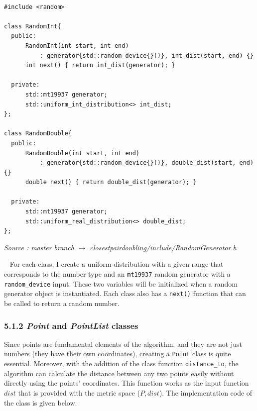 \documentclass[12pt,english,]{article}
\newcommand{\code}[1]{\colorbox{lbcolor}{\texttt{#1}}}
\begin{document}
~

\begin{lstlisting}
#include <random>

class RandomInt{
  public:
      RandomInt(int start, int end) 
          : generator{std::random_device{}()}, int_dist(start, end) {}
      int next() { return int_dist(generator); } 

  private:
      std::mt19937 generator;
      std::uniform_int_distribution<> int_dist;
};

class RandomDouble{
  public:
      RandomDouble(int start, int end) 
          : generator{std::random_device{}()}, double_dist(start, end) {}
      double next() { return double_dist(generator); } 

  private:
      std::mt19937 generator;
      std::uniform_real_distribution<> double_dist;
};
\end{lstlisting}
\vspace{-2truemm}
\begin{minipage}{1\textwidth}
  \begin{flushright}
  {\footnotesize \emph{Source \footnotemark: master branch $\rightarrow$ closestpairdoubling/include/RandomGenerator.h }\par}
  \end{flushright}
\end{minipage}
\vspace{0.5truemm}

~ For each class, I create a uniform distribution with a given range
that corresponds to the number type and an \code{mt19937} random
generator with a \code{random\_device} input. These two variables will
be initialized when a random generator object is instantiated. Each
class also has a \code{next()} function that can be called to return a
random number.

\hypertarget{section5.1.2}{%
\subsubsection{\texorpdfstring{5.1.2 \emph{Point} and \emph{PointList}
classes}{5.1.2  and  classes}}\label{section5.1.2}}

Since points are fundamental elements of the algorithm, and they are not
just numbers (they have their own coordinates), creating a \code{Point}
class is quite essential. Moreover, with the addition of the class
function \code{distance\_to}, the algorithm can calculate the distance
between any two points easily without directly using the points'
coordinates. This function works as the input function \(dist\) that is
provided with the metric space (\(P, dist\)). The implementation code of
the class is given below.
\end{document}
